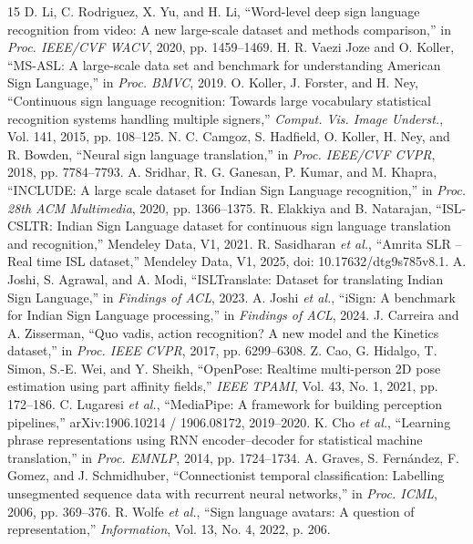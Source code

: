\documentclass[a4paper,12pt]{article}
\begin{document}
\begin{thebibliography}{15}
 D. Li, C. Rodriguez, X. Yu, and H. Li, ``Word-level deep sign language recognition from video: A new large-scale dataset and methods comparison,'' in \textit{Proc. IEEE/CVF WACV}, 2020, pp. 1459--1469.
 H. R. Vaezi Joze and O. Koller, ``MS-ASL: A large-scale data set and benchmark for understanding American Sign Language,'' in \textit{Proc. BMVC}, 2019.
 O. Koller, J. Forster, and H. Ney, ``Continuous sign language recognition: Towards large vocabulary statistical recognition systems handling multiple signers,'' \textit{Comput. Vis. Image Underst.}, Vol. 141, 2015, pp. 108--125.
 N. C. Camgoz, S. Hadfield, O. Koller, H. Ney, and R. Bowden, ``Neural sign language translation,'' in \textit{Proc. IEEE/CVF CVPR}, 2018, pp. 7784--7793.
 A. Sridhar, R. G. Ganesan, P. Kumar, and M. Khapra, ``INCLUDE: A large scale dataset for Indian Sign Language recognition,'' in \textit{Proc. 28th ACM Multimedia}, 2020, pp. 1366--1375.
 R. Elakkiya and B. Natarajan, ``ISL-CSLTR: Indian Sign Language dataset for continuous sign language translation and recognition,'' Mendeley Data, V1, 2021.
 R. Sasidharan \textit{et al.}, ``Amrita SLR -- Real time ISL dataset,'' Mendeley Data, V1, 2025, doi: 10.17632/dtg9s785v8.1.
 A. Joshi, S. Agrawal, and A. Modi, ``ISLTranslate: Dataset for translating Indian Sign Language,'' in \textit{Findings of ACL}, 2023.
 A. Joshi \textit{et al.}, ``iSign: A benchmark for Indian Sign Language processing,'' in \textit{Findings of ACL}, 2024.
 J. Carreira and A. Zisserman, ``Quo vadis, action recognition? A new model and the Kinetics dataset,'' in \textit{Proc. IEEE CVPR}, 2017, pp. 6299--6308.
 Z. Cao, G. Hidalgo, T. Simon, S.-E. Wei, and Y. Sheikh, ``OpenPose: Realtime multi-person 2D pose estimation using part affinity fields,'' \textit{IEEE TPAMI}, Vol. 43, No. 1, 2021, pp. 172--186.
 C. Lugaresi \textit{et al.}, ``MediaPipe: A framework for building perception pipelines,'' arXiv:1906.10214 / 1906.08172, 2019--2020.
 K. Cho \textit{et al.}, ``Learning phrase representations using RNN encoder--decoder for statistical machine translation,'' in \textit{Proc. EMNLP}, 2014, pp. 1724--1734.
 A. Graves, S. Fern\'andez, F. Gomez, and J. Schmidhuber, ``Connectionist temporal classification: Labelling unsegmented sequence data with recurrent neural networks,'' in \textit{Proc. ICML}, 2006, pp. 369--376.
 R. Wolfe \textit{et al.}, ``Sign language avatars: A question of representation,'' \textit{Information}, Vol. 13, No. 4, 2022, p. 206.
\end{thebibliography}
\end{document}
